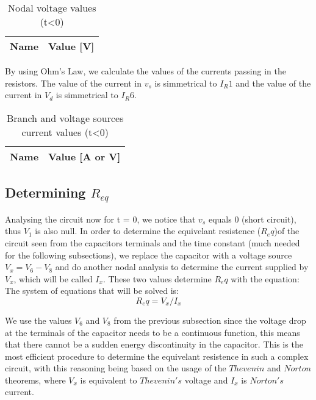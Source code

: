 \begin{table}[H]
  \centering
  \begin{tabular}{|l|r|}
    \hline    
    {\bf Name} & {\bf Value [V]} \\ \hline
    
  \end{tabular}
  \caption{Nodal voltage values (t<0)}
  \label{tab:mat1a}
\end{table}

By using Ohm's Law, we calculate the values of the currents passing in the resistors. The value of the current in $v_s$ is simmetrical to $I_R1$ and the value of the current in $V_d$ is simmetrical to $I_R6$.
\begin{table}[H]
  \centering
  \begin{tabular}{|l|r|}
    \hline    
    {\bf Name} & {\bf Value [A or V]} \\ \hline
    
  \end{tabular}
  \caption{Branch and voltage sources current values (t<0)}
  \label{tab:mat1}
\end{table}



\subsection{Determining $R_{eq}$}

Analysing the circuit now for t = 0, we notice that $v_s$ equals 0 (short circuit), thus $V_1$ is also null.
In order to determine the equivelant resistence ($R_eq$)of the circuit seen from the capacitors terminals and the time constant (much needed for the following subsections), we replace the capacitor with a voltage source $V_x = V_6 - V_8$ and do another nodal analysis to determine the current supplied by $V_x$, which will be called $I_x$.
These two values determine $R_eq$ with the equation:
The system of equations that will be solved is:
\begin{equation}
R_eq = V_x/I_x
\label{eq:1.9}
\end{equation}

We use the values $V_6$ and $V_8$ from the previous subsection since the voltage drop at the terminals of the capacitor needs to be a continuous function, this means that there cannot be a sudden energy discontinuity in the capacitor.
This is the most efficient procedure to determine the equivelant resistence in such a complex circuit, with this reasoning being based on the usage of the $Thevenin$ and $Norton$ theorems, where $V_x$ is equivalent to $Thevenin's$ voltage and $I_x$ is $Norton's$ current.

